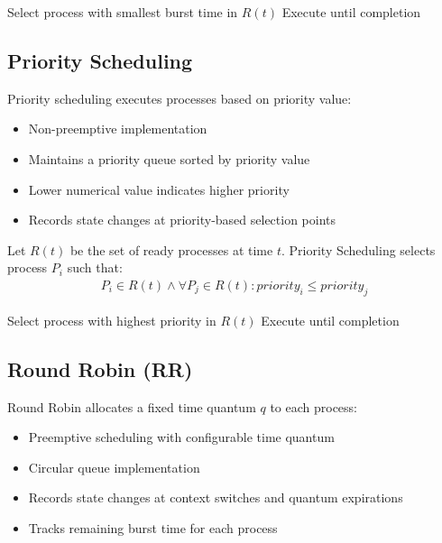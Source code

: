 \documentclass[12pt,a4paper]{report}
\begin{document}
\begin{algorithm}[H]
\caption{SJF Algorithm}
\begin{algorithmic}[1]
        \State Select process with smallest burst time in $R(t)$
        \State Execute until completion
    \EndWhile
\end{algorithmic}
\end{algorithm}

\subsection{Priority Scheduling}
Priority scheduling executes processes based on priority value:
\begin{itemize}
    \item Non-preemptive implementation
    \item Maintains a priority queue sorted by priority value
    \item Lower numerical value indicates higher priority
    \item Records state changes at priority-based selection points
\end{itemize}

Let $R(t)$ be the set of ready processes at time $t$. Priority Scheduling selects process $P_i$ such that:
\begin{align}
P_i \in R(t) \wedge \forall P_j \in R(t): priority_i \leq priority_j
\end{align}

\begin{algorithm}[H]
\caption{Priority Scheduling Algorithm}
\begin{algorithmic}[1]
        \State Select process with highest priority in $R(t)$
        \State Execute until completion
    \EndWhile
\end{algorithmic}
\end{algorithm}

\subsection{Round Robin (RR)}
Round Robin allocates a fixed time quantum $q$ to each process:
\begin{itemize}
    \item Preemptive scheduling with configurable time quantum
    \item Circular queue implementation
    \item Records state changes at context switches and quantum expirations
    \item Tracks remaining burst time for each process
\end{itemize}
\end{document}
